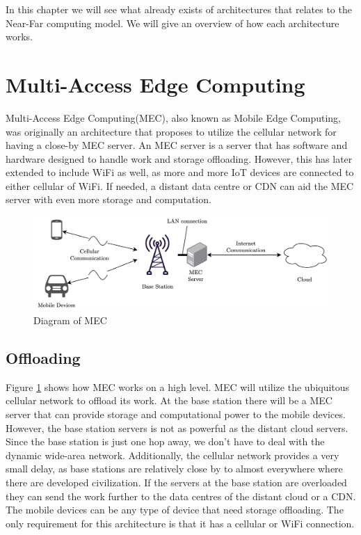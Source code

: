 
In this chapter we will see what already exists of architectures that relates to the Near-Far computing model. We will give an overview of how each architecture works.




\section{Multi-Access Edge Computing}
Multi-Access Edge Computing(MEC), also known as Mobile Edge Computing, was originally an architecture that proposes to utilize the cellular network for having a close-by MEC server\cite{porambage_survey_2018}. An MEC server is a server that has software and hardware designed to handle work and storage offloading. However, this has later extended to include WiFi as well, as more and more IoT devices are connected to either cellular of WiFi. If needed, a distant data centre or CDN can aid the MEC server with even more storage and computation.
\begin{figure}[t]
    \centering
    \includegraphics[scale=0.75]{chapters/architectures/figures/MEC.png}
    \caption{Diagram of MEC}
    \label{fig:MEC}
\end{figure}

\subsection{Offloading}
Figure \ref{fig:MEC} shows how MEC works on a high level. MEC will utilize the ubiquitous cellular network to offload its work. At the base station there will be a MEC server that can provide storage and computational power to the mobile devices. However, the base station servers is not as powerful as the distant cloud servers. Since the base station is just one hop away, we don't have to deal with the dynamic wide-area network. Additionally, the cellular network provides a very small delay, as base stations are relatively close by to almost everywhere where there are developed civilization. If the servers at the base station are overloaded they can send the work further to the data centres of the distant cloud or a CDN. The mobile devices can be any type of device that need storage offloading. The only requirement for this architecture is that it has a cellular or WiFi connection.

